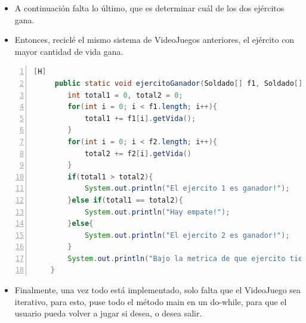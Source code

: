 \documentclass{article}
\begin{document}
	\begin{itemize}	
		\item A continuación falta lo último, que es determinar cuál de los dos ejércitos gana.
		\item Entonces, reciclé el mismo sistema de VideoJuegos anteriores, el ejército con mayor cantidad de vida gana.
	\end{itemize}
	
	\begin{lstlisting}[language=java,caption={Ejército ganador}, numbers=left][H]
	 public static void ejercitoGanador(Soldado[] f1, Soldado[] f2){
        int total1 = 0, total2 = 0;
        for(int i = 0; i < f1.length; i++){
            total1 += f1[i].getVida();
        }
        for(int i = 0; i < f2.length; i++){
            total2 += f2[i].getVida()
        }
        if(total1 > total2){
            System.out.println("El ejercito 1 es ganador!");
        }else if(total1 == total2){
            System.out.println("Hay empate!");
        }else{
            System.out.println("El ejercito 2 es ganador!");
        }
        System.out.println("Bajo la metrica de que ejercito tiene mas vida");
    }
	\end{lstlisting}
	\begin{itemize}	
		\item Finalmente, una vez todo está implementado, solo falta que el VideoJuego sea iterativo, para esto, puse todo el método main en un do-while, para que el usuario pueda volver a jugar si desea, o desea salir.
	\end{itemize}
\end{document}

